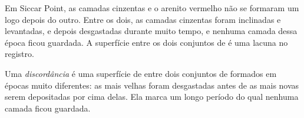 Em Siccar Point, as camadas cinzentas e o arenito vermelho não se
formaram um logo depois do outro. Entre os dois, as camadas cinzentas
foram inclinadas e levantadas, e depois desgastadas durante muito tempo,
e nenhuma camada dessa época ficou guardada. A superfície entre os dois
conjuntos de  é uma lacuna no registro.

\begin{definition}[Discordância]\label{def:g7:geological-time:unconformity}
Uma \emph{discordância} é uma superfície de 
entre dois conjuntos de  formados em épocas muito diferentes: as
 mais velhas foram desgastadas antes de as mais novas serem
depositadas por cima delas. Ela marca um longo período do qual nenhuma
camada ficou guardada.
\end{definition}

